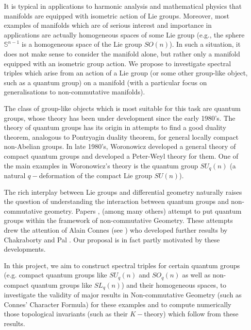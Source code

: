 \documentclass[12pt]{article}
\begin{document}
It is typical in applications to harmonic analysis \cite{helgason} and mathematical physics \cite{c2dft} that manifolds are equipped with isometric action of Lie groups. Moreover, most examples of manifolds which are of serious interest and importance in applications are actually homogeneous spaces of some Lie group (e.g., the sphere $\mathbb{S}^{n-1}$ is a homogeneous space of the Lie group $SO(n)$). In such a situation, it does not make sense to consider the manifold alone, but rather only a manifold equipped with an isometric group action. We propose to investigate spectral triples which arise from an action of a Lie group (or some other group-like object, such as a quantum group) on a manifold (with a particular focus on generalisations to non-commutative manifolds).

The class of group-like objects which is most suitable for this task are quantum groups, whose theory has been under development since the early 1980's. The theory of quantum groups has its origin in attempts to find a good duality theorem, analogous to Pontryagin duality theorem, for general locally compact non-Abelian groups. In late 1980's, Woronowicz developed a general theory of compact quantum groups and developed a Peter-Weyl theory for them. One of the main examples in Woronowicz's theory is the quantum group $SU_q(n)$ (a natural $q-$deformation of the compact Lie group $SU(n)$). 

The rich interplay between Lie groups and differential geometry naturally raises the question of understanding the interaction between quantum groups and non-commutative geometry. Papers \cite{ChakrabortyPal}, \cite{NeshTus} (among many others) attempt to put quantum groups within the framework of non-commutative Geometry. These attempts drew the attention of Alain Connes (see \cite{Connes-suq2}) who developed further results by Chakraborty and Pal \cite{ChakrabortyPal}. Our proposal is in fact partly motivated by these developments.

In this project, we aim to construct spectral triples for certain quantum groups (e.g. compact quantum groups like $SU_q(n)$ and $SO_q(n)$ as well as non-compact quantum groups like $SL_q(n)$) and their homogeneous spaces, to investigate the validity of major results in Non-commutative Geometry (such as Connes' Character Formula) for these examples and to compute numerically those topological invariants (such as their $K-$theory) which follow from these results.
\end{document}
